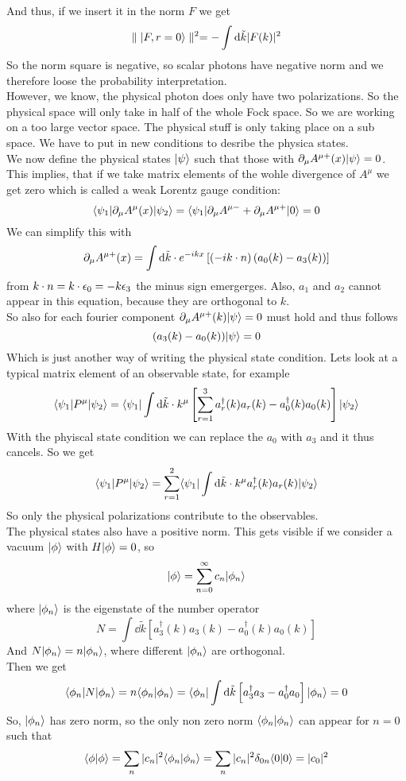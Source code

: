 And thus, if we insert it in the norm $F$ we get
\[ \parallel | F, r = 0\rangle \parallel ^2 = - \int {\rm d} \tilde k | F(k)| ^2 \]
So the norm square is negative, so scalar photons have negative norm and we therefore loose the probability interpretation.\\
However, we know, the physical photon does only have two polarizations. So the physical space will only take in half of the whole Fock space. So we are working on a too large vector space. The physical stuff is only taking place on a sub space.
We have to put in new conditions to desribe the physica states.\\
We now define the physical states $| \psi \rangle$ such that those with $\partial_\mu A^{\mu +}(x) | \psi\rangle = 0$. This implies, that if we take matrix elements of the wohle divergence of $A^\mu$ we get zero which is called a weak Lorentz gauge condition:
\[ \langle \psi_1 | \partial_\mu A^\mu(x) | \psi_2\rangle = \langle \psi_1 | \partial_\mu A^{\mu -} + \partial_\mu A^{\mu +} | 0 \rangle = 0\]
We can simplify this with
\[ \partial_\mu A^{\mu +} (x) = \int {\rm d} \tilde k \cdot e^{-ikx} \left[ ( - ik \cdot n) \left( a_0(k) - a_3(k) \right) \right] \]
from $k \cdot n = k \cdot \epsilon_0 = - k \epsilon_3$ the minus sign emergerges. Also, $a_1$ and $a_2$ cannot appear in this equation, because they are orthogonal to $k$.\\
So also for each fourier component $\partial_\mu A^{\mu +} (k) | \psi \rangle = 0$ must hold and thus follows
\[ ( a_3(k) - a_0(k) ) | \psi \rangle = 0\]
Which is just another way of writing the physical state condition. 
 Lets look at a typical matrix element of an observable state, for example
 \[ \langle \psi_1 | P^\mu | \psi_2 \rangle = \langle \psi_1 | \int {\rm d} \tilde k \cdot k^\mu \left[ \sum_{r = 1}^3 a_r^\dagger(k) a_r(k) - a_0^\dagger(k) a_0(k) \right] | \psi_2 \rangle\]
 With the phyiscal state condition we can replace the $a_0$ with $a_3$ and it thus cancels. So we get
 \[ \langle \psi_1 | P^\mu | \psi_2 \rangle = \sum_{r = 1}^2 \langle \psi_1 | \int {\rm d} \tilde k \cdot k^\mu a_r^\dagger (k) a_r(k) | \psi_2\rangle\]
 So only the physical polarizations contribute to the observables.\\
The physical states also have a positive norm. This gets visible if we consider a vacuum $| \phi \rangle $ with $H | \phi \rangle = 0$, so 
\[  | \phi \rangle = \sum_{n = 0}^\infty c_n | \phi_n\rangle\]
where $| \phi_n\rangle$ is the eigenstate of the number operator
\[ N = \int \dd \tilde k \left[ a_3^\dagger(k) a_3(k) - a_0^\dagger(k) a_0(k) \right]\]
And $N | \phi_n \rangle = n | \phi_n \rangle$, where different $| \phi_n\rangle$ are orthogonal.\\
Then we get 
\[\langle \phi_n | N | \phi_n \rangle = n \langle \phi_n | \phi_n \rangle = \langle \phi_n | \int {\rm d} \tilde k \left[ a_3^\dagger a_3 - a_0 ^\dagger a_0 \right] | \phi_n \rangle = 0\]
So, $| \phi_n \rangle $ has zero norm, so the only non zero norm $\langle \phi_n | \phi_n \rangle$ can appear for $n = 0$ such that
\[ \langle \phi | \phi \rangle = \sum_n | c_n|^2 \langle \phi_n | \phi_n \rangle = \sum_n | c_n|^2 \delta_{0n} \langle 0 | 0 \rangle = | c_0 |^2\]

 
